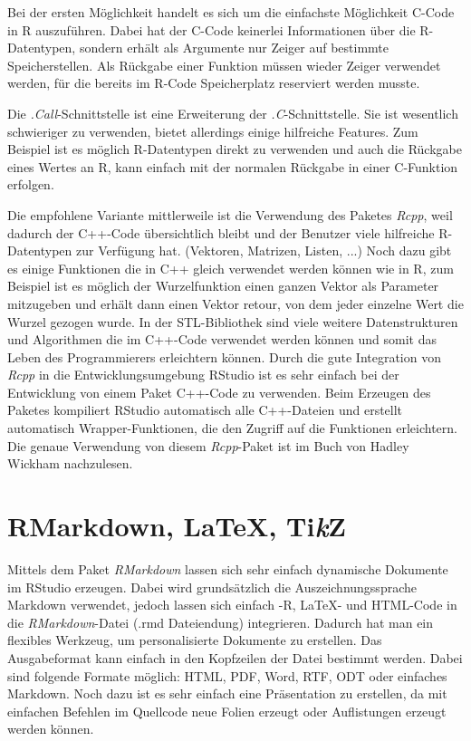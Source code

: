 Bei der ersten Möglichkeit handelt es sich um die einfachste Möglichkeit C-Code in R auszuführen. Dabei hat der C-Code keinerlei Informationen über die R-Datentypen, sondern erhält als Argumente nur Zeiger auf bestimmte Speicherstellen. Als Rückgabe einer Funktion müssen wieder Zeiger verwendet werden, für die bereits im R-Code Speicherplatz reserviert werden musste.

Die \emph{.Call}-Schnittstelle ist eine Erweiterung der \emph{.C}-Schnittstelle. Sie ist wesentlich schwieriger zu verwenden, bietet allerdings einige hilfreiche Features. Zum Beispiel ist es möglich R-Datentypen direkt zu verwenden und auch die Rückgabe eines Wertes an R, kann einfach mit der normalen Rückgabe in einer C-Funktion erfolgen. \cite{wickham2015r}

Die empfohlene Variante mittlerweile ist die Verwendung des Paketes \emph{Rcpp}, weil dadurch der C++-Code übersichtlich bleibt und der Benutzer viele hilfreiche R-Datentypen zur Verfügung hat. (Vektoren, Matrizen, Listen, ...) Noch dazu gibt es einige Funktionen die in C++ gleich verwendet werden können wie in R, zum Beispiel ist es möglich der Wurzelfunktion einen ganzen Vektor als Parameter mitzugeben und erhält dann einen Vektor retour, von dem jeder einzelne Wert die Wurzel gezogen wurde. In der STL-Bibliothek sind viele weitere Datenstrukturen und Algorithmen die im C++-Code verwendet werden können und somit das Leben des Programmierers erleichtern können. Durch die gute Integration von \emph{Rcpp} in die Entwicklungsumgebung RStudio ist es sehr einfach bei der Entwicklung von einem Paket C++-Code zu verwenden. Beim Erzeugen des Paketes kompiliert RStudio automatisch alle C++-Dateien und erstellt automatisch Wrapper-Funktionen, die den Zugriff auf die Funktionen erleichtern. Die genaue Verwendung von diesem \emph{Rcpp}-Paket ist im Buch von Hadley Wickham nachzulesen. \cite{wickham2015advanced} 
\section{RMarkdown, \LaTeX, Ti\textit{k}Z}
\label{sec:RMarkdown}
Mittels dem Paket \emph{RMarkdown} lassen sich sehr einfach dynamische Dokumente im RStudio erzeugen. Dabei wird grundsätzlich die Auszeichnungssprache Markdown verwendet, jedoch lassen sich einfach -R, \LaTeX - und HTML-Code in die \emph{RMarkdown}-Datei (.rmd Dateiendung) integrieren. Dadurch hat man ein flexibles Werkzeug, um personalisierte Dokumente zu erstellen. Das Ausgabeformat kann einfach in den Kopfzeilen der Datei bestimmt werden. Dabei sind folgende Formate möglich: HTML, PDF, Word, RTF, ODT oder einfaches Markdown. Noch dazu ist es sehr einfach eine Präsentation zu erstellen, da mit einfachen Befehlen im Quellcode neue Folien erzeugt oder Auflistungen erzeugt werden können.

